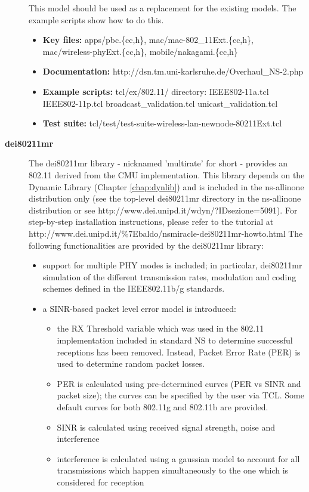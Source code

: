 \begin{description}
This model should be used as a replacement for the existing models.  The
example scripts show how to do this.
\begin{itemize}
\item {\bf Key files:}  apps/pbc.\{cc,h\}, mac/mac-802\_11Ext.\{cc,h\}, mac/wireless-phyExt.\{cc,h\}, mobile/nakagami.\{cc,h\}
\item {\bf Documentation:}  http://dsn.tm.uni-karlsruhe.de/Overhaul\_NS-2.php
\item {\bf Example scripts:}  tcl/ex/802.11/ directory:  IEEE802-11a.tcl IEEE802-11p.tcl broadcast\_validation.tcl unicast\_validation.tcl
\item {\bf Test suite:}  tcl/test/test-suite-wireless-lan-newnode-80211Ext.tcl
\end{itemize}
\item[{\bf dei80211mr}]
The dei80211mr library - nicknamed 'multirate' for short - provides an 
802.11 derived from the CMU implementation.
This library depends on the Dynamic Library (Chapter \ref{chap:dynlib}) and
is included in the ns-allinone distribution only (see the 
top-level dei80211mr directory in the ns-allinone distribution or
see http://www.dei.unipd.it/wdyn/?IDsezione=5091).
For step-by-step installation instructions, please refer to the tutorial at
http://www.dei.unipd.it/\%7Ebaldo/nsmiracle-dei80211mr-howto.html
The following functionalities are provided by the dei80211mr library:
\begin{itemize}
\item support for multiple PHY modes is included; in particolar, dei80211mr simulation of the different transmission rates, modulation and coding schemes defined in the IEEE802.11b/g standards.
\item a SINR-based packet level error model is introduced:
\begin{itemize}
          \item the RX Threshold variable which was used in the 802.11 implementation included in standard NS to determine successful receptions has been removed. Instead, Packet Error Rate (PER) is used to determine random packet losses.
          \item PER is calculated using pre-determined curves (PER vs SINR and packet size); the curves can be specified by the user via TCL. Some default curves for both 802.11g and 802.11b are provided.
          \item SINR is calculated using received signal strength, noise and interference
          \item interference is calculated using a gaussian model to account for all transmissions which happen simultaneously to the one which is considered for reception

\end{itemize}
\end{itemize}
\end{description}
